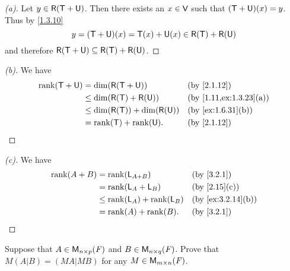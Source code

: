 \begin{proof}[(a)]
  Let \(y \in \rg{\T + \U}\).
  Then there exists an \(x \in \mathsf{V}\) such that \((\mathsf{T} + \mathsf{U})(x) = y\).
  Thus by \cref{1.3.10}
  \[
    y = (\T + \U)(x) = \T(x) + \U(x) \in \rg{\T} + \rg{\U}
  \]
  and therefore \(\rg{\T + \U} \subseteq \rg{\T} + \rg{\U}\).
\end{proof}

\begin{proof}[(b)]
  We have
  \begin{align*}
    \rk{\T + \U} & = \dim(\rg{\T + \U})               &  & \text{(by \cref{2.1.12})}            \\
                 & \leq \dim(\rg{\T} + \rg{\U})       &  & \text{(by \cref{1.11,ex:1.3.23}(a))} \\
                 & \leq \dim(\rg{\T}) + \dim(\rg{\U}) &  & \text{(by \cref{ex:1.6.31}(b))}      \\
                 & = \rk{\T} + \rk{\U}.               &  & \text{(by \cref{2.1.12})}
  \end{align*}
\end{proof}

\begin{proof}[(c)]
  We have
  \begin{align*}
    \rk{A + B} & = \rk{\L_{A + B}}          &  & \text{(by \cref{3.2.1})}        \\
               & = \rk{\L_A + \L_B}         &  & \text{(by \cref{2.15}(c))}      \\
               & \leq \rk{\L_A} + \rk{\L_B} &  & \text{(by \cref{ex:3.2.14}(b))} \\
               & = \rk{A} + \rk{B}.         &  & \text{(by \cref{3.2.1})}
  \end{align*}
\end{proof}

\begin{ex}\label{ex:3.2.15}
  Suppose that \(A \in \mathsf{M}_{{n} \times p}({\mathit{F}})\) and \(B \in \mathsf{M}_{{n} \times q}({\mathit{F}})\).
  Prove that \(M (A | B) = (MA | MB)\) for any \(M \in \mathsf{M}_{{m} \times n}({\mathit{F}})\).
\end{ex}


